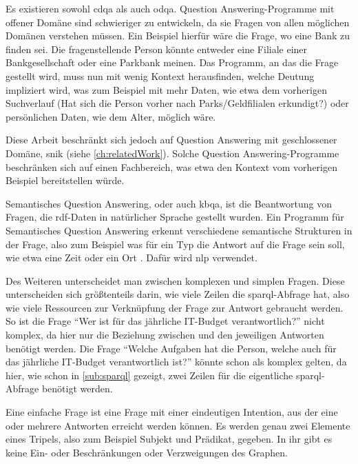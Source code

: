 Es existieren sowohl \ac{cdqa} als auch \ac{odqa}.
Question Answering-Programme mit offener Domäne sind schwieriger zu entwickeln,
da sie Fragen von allen möglichen Domänen verstehen müssen.
Ein Beispiel hierfür wäre die Frage, wo eine Bank zu finden sei.
Die fragenstellende Person könnte entweder eine Filiale einer Bankgesellschaft oder eine Parkbank meinen.
Das Programm, an das die Frage gestellt wird, muss nun mit wenig Kontext herausfinden,
welche Deutung impliziert wird, was zum Beispiel mit mehr Daten,
wie etwa dem vorherigen Suchverlauf (Hat sich die Person vorher nach Parks/Geldfilialen erkundigt?)
oder persönlichen Daten, wie dem Alter, möglich wäre.

Diese Arbeit beschränkt sich jedoch auf Question Answering mit geschlossener Domäne, \acs{snik} (siehe \cref{ch:relatedWork}).
Solche Question Answering-Programme beschränken sich auf einen Fachbereich,
was etwa den Kontext vom vorherigen Beispiel bereitstellen würde.

\begin{definition}
Semantisches Question Answering, oder auch \ac{kbqa}, ist die Beantwortung von Fragen, die \ac{rdf}-Daten in natürlicher Sprache gestellt wurden.
Ein Programm für Semantisches Question Answering erkennt verschiedene semantische Strukturen in der Frage,
also zum Beispiel was für ein Typ die Antwort auf die Frage sein soll, wie etwa eine Zeit oder ein Ort \citep{sqadefinition}.
Dafür wird \acs{nlp} verwendet.
\end{definition}

Des Weiteren unterscheidet man zwischen komplexen und simplen Fragen.
Diese unterscheiden sich größtenteils darin, wie viele Zeilen die \ac{sparql}-Abfrage hat, also wie viele Ressourcen zur Verknüpfung der Frage zur Antwort gebraucht werden.
So ist die Frage \enquote{Wer ist für das jährliche IT-Budget verantwortlich?} nicht komplex,
da hier nur die Beziehung zwischen  und den jeweiligen Antworten benötigt werden.
Die Frage \enquote{Welche Aufgaben hat die Person, welche auch für das jährliche IT-Budget verantwortlich ist?} könnte schon als komplex gelten, da hier, wie schon in \cref{sub:sparql} gezeigt,
zwei Zeilen für die eigentliche \ac{sparql}-Abfrage benötigt werden.
\begin{definition}\label{def:efrage}
Eine einfache Frage ist eine Frage mit einer eindeutigen Intention, aus der eine oder mehrere Antworten erreicht werden können.
Es werden genau zwei Elemente eines Tripels, also zum Beispiel Subjekt und Prädikat, gegeben.
In ihr gibt es keine Ein- oder Beschränkungen oder Verzweigungen des Graphen.
\end{definition}

